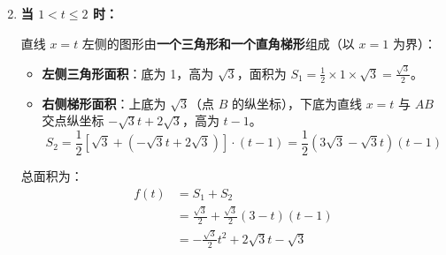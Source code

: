 \documentclass[10pt,aspectratio=169,serif,fleqn]{beamer}
\begin{document}
\begin{frame}
	\vspace{-1em}
	\begin{tcolorbox}[colback=orange!10,colframe=orange,title=\textbf{接上页}]			
		\begin{enumerate}
			\setcounter{enumi}{1}			
			\item \textbf{当 \(1 < t \le 2\) 时：}
			
			直线 \(x=t\) 左侧的图形由\textbf{一个三角形和一个直角梯形}组成（以 \(x=1\) 为界）：
			\begin{itemize}
				\item \textbf{左侧三角形面积}：底为 1，高为 \(\sqrt{3}\)，面积为 \(S_1 = \frac{1}{2} \times 1 \times \sqrt{3} = \frac{\sqrt{3}}{2}\)。
				\item \textbf{右侧梯形面积}：上底为 \(\sqrt{3}\)（点 \(B\) 的纵坐标），下底为直线 \(x=t\) 与 \(AB\) 交点纵坐标 \(-\sqrt{3}t + 2\sqrt{3}\)，高为 \(t-1\)。
				\[
				S_2 = \frac{1}{2} \left[ \sqrt{3} + (-\sqrt{3}t + 2\sqrt{3}) \right] \cdot (t-1) = \frac{1}{2} (3\sqrt{3} - \sqrt{3}t)(t-1)
				\]
			\end{itemize}
			总面积为：
			\begin{align*}
				f(t) &= S_1 + S_2 \\
				&= \frac{\sqrt{3}}{2} + \frac{\sqrt{3}}{2}(3-t)(t-1) \\
				&= -\frac{\sqrt{3}}{2}t^2 + 2\sqrt{3}t - \sqrt{3}
			\end{align*}
			
			
		\end{enumerate}
		
	
	\end{tcolorbox}
	
	
\end{frame}
\end{document}
